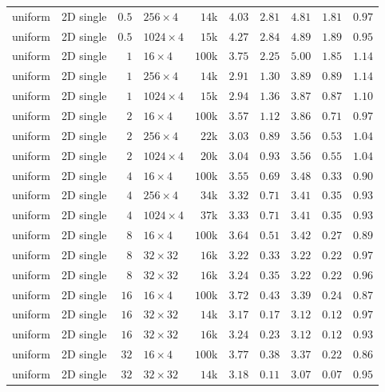 {\begin{longtable}{llrlrrrrrr}
    uniform & 2D single & $0.5$ & $256{\times}4$ & $14$k & $4.03$ & $2.81$ & $4.81$ & $1.81$ & $0.97$ \\
    uniform & 2D single & $0.5$ & $1024{\times}4$ & $15$k & $4.27$ & $2.84$ & $4.89$ & $1.89$ & $0.95$ \\
    uniform & 2D single & $1$ & $16{\times}4$ & $100$k & $3.75$ & $2.25$ & $5.00$ & $1.85$ & $1.14$ \\
    uniform & 2D single & $1$ & $256{\times}4$ & $14$k & $2.91$ & $1.30$ & $3.89$ & $0.89$ & $1.14$ \\
    uniform & 2D single & $1$ & $1024{\times}4$ & $15$k & $2.94$ & $1.36$ & $3.87$ & $0.87$ & $1.10$ \\
    uniform & 2D single & $2$ & $16{\times}4$ & $100$k & $3.57$ & $1.12$ & $3.86$ & $0.71$ & $0.97$ \\
    uniform & 2D single & $2$ & $256{\times}4$ & $22$k & $3.03$ & $0.89$ & $3.56$ & $0.53$ & $1.04$ \\
    uniform & 2D single & $2$ & $1024{\times}4$ & $20$k & $3.04$ & $0.93$ & $3.56$ & $0.55$ & $1.04$ \\
    uniform & 2D single & $4$ & $16{\times}4$ & $100$k & $3.55$ & $0.69$ & $3.48$ & $0.33$ & $0.90$ \\
    uniform & 2D single & $4$ & $256{\times}4$ & $34$k & $3.32$ & $0.71$ & $3.41$ & $0.35$ & $0.93$ \\
    uniform & 2D single & $4$ & $1024{\times}4$ & $37$k & $3.33$ & $0.71$ & $3.41$ & $0.35$ & $0.93$ \\
    uniform & 2D single & $8$ & $16{\times}4$ & $100$k & $3.64$ & $0.51$ & $3.42$ & $0.27$ & $0.89$ \\
    uniform & 2D single & $8$ & $32{\times}32$ & $16$k & $3.22$ & $0.33$ & $3.22$ & $0.22$ & $0.97$ \\
    uniform & 2D single & $8$ & $32{\times}32$ & $16$k & $3.24$ & $0.35$ & $3.22$ & $0.22$ & $0.96$ \\
    uniform & 2D single & $16$ & $16{\times}4$ & $100$k & $3.72$ & $0.43$ & $3.39$ & $0.24$ & $0.87$ \\
    uniform & 2D single & $16$ & $32{\times}32$ & $14$k & $3.17$ & $0.17$ & $3.12$ & $0.12$ & $0.97$ \\
    uniform & 2D single & $16$ & $32{\times}32$ & $16$k & $3.24$ & $0.23$ & $3.12$ & $0.12$ & $0.93$ \\
    uniform & 2D single & $32$ & $16{\times}4$ & $100$k & $3.77$ & $0.38$ & $3.37$ & $0.22$ & $0.86$ \\
    uniform & 2D single & $32$ & $32{\times}32$ & $14$k & $3.18$ & $0.11$ & $3.07$ & $0.07$ & $0.95$ \\

\end{longtable}}
